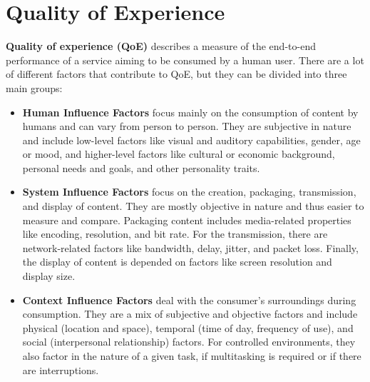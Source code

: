 \section{Quality of Experience}
\textbf{Quality of experience (QoE)} describes a measure of the end-to-end performance of a service aiming to be consumed by a human user. There are a lot of different factors that contribute to QoE, but they can be divided into three main groups: \cite{RBDML+14}

\begin{itemize}
	
	\item \textbf{Human Influence Factors} focus mainly on the consumption of content by humans and can vary from person to person. They are subjective in nature and include low-level factors like visual and auditory capabilities, gender, age or mood, and higher-level factors like cultural or economic background, personal needs and goals, and other personality traits. 
	
	
	\item \textbf{System Influence Factors} focus on the creation, packaging, transmission, and display of content. They are mostly objective in nature and thus easier to measure and compare. Packaging content includes media-related properties like encoding, resolution, and bit rate. For the transmission, there are network-related factors like bandwidth, delay, jitter, and packet loss. Finally, the display of content is depended on factors like screen resolution and display size.
	
	
	\item \textbf{Context Influence Factors} deal with the consumer's surroundings during consumption. They are a mix of subjective and objective factors and include physical (location and space), temporal (time of day, frequency of use), and social (interpersonal relationship) factors. For controlled environments, they also factor in the nature of a given task, if multitasking is required or if there are interruptions.
	
	
	
\end{itemize}

